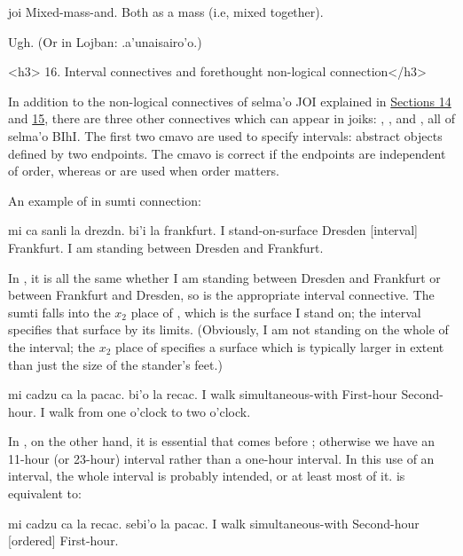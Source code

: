 \begin{example}
joi\n
Mixed-mass-and.\n
Both as a mass (i.e, mixed together).
\end{example}

Ugh. (Or in Lojban: .a'unaisairo'o.) 

<h3>
16. Interval connectives and forethought non-logical
    connection</h3>

In addition to the non-logical connectives of selma'o JOI
    explained in \hyperref[sec:14:14]{Sections 14} and \hyperref[sec:14:15]{15}, there are three other connectives which can
    appear in joiks: , , and , all of
    selma'o BIhI. The first two cmavo are used to specify
    intervals: abstract objects defined by two endpoints. The cmavo
     is correct if the endpoints are independent of order,
    whereas  or  are used when order matters.

An example of  in sumti connection:
\begin{example}
mi ca sanli\n
\T	la drezdn. bi'i la frankfurt.\n
I  stand-on-surface\n
\T	Dresden [interval] Frankfurt.\n
I am standing between Dresden and Frankfurt.
\end{example}

In , it is all the same
    whether I am standing between Dresden and Frankfurt or between
    Frankfurt and Dresden, so  is the appropriate interval
    connective. The sumti  falls
    into the $x_2$ place of , which is the surface I stand
    on; the interval specifies that surface by its limits.
    (Obviously, I am not standing on the whole of the interval; the
    $x_2$ place of  specifies a surface which is typically
    larger in extent than just the size of the stander's feet.)
\begin{example}
mi cadzu ca\n
\T	la pacac. bi'o la recac.\n
I walk simultaneous-with\n
\T	First-hour  Second-hour.\n
I walk from one o'clock to two o'clock.
\end{example}

In , on the other hand, it is
    essential that  comes before ;
    otherwise we have an 11-hour (or 23-hour) interval rather than
    a one-hour interval. In this use of an interval, the whole
    interval is probably intended, or at least most of it. 
 is equivalent to:
\begin{example}
mi cadzu ca\n
\T	la recac. sebi'o la pacac.\n
I walk simultaneous-with\n
\T	Second-hour  [ordered] First-hour.
\end{example}

